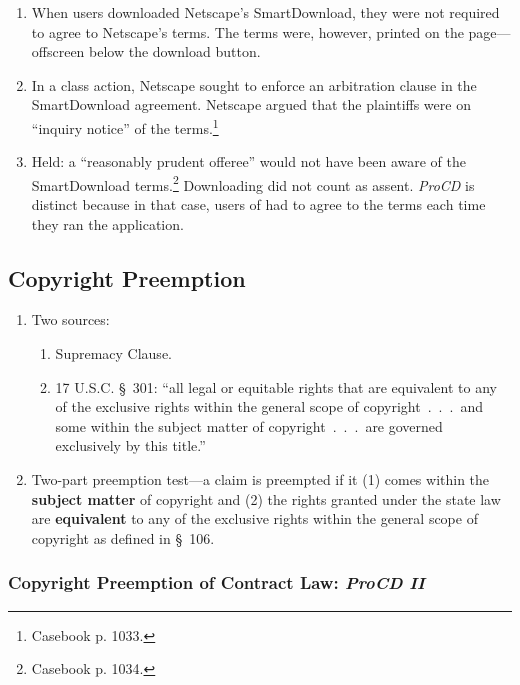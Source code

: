 \begin{enumerate}
    \item When users downloaded Netscape's SmartDownload, they were not 
    required to agree to Netscape's terms. The terms were, however, printed on 
    the page---offscreen below the download button.
    \item In a class action, Netscape sought to enforce an arbitration clause 
    in the SmartDownload agreement. Netscape argued that the plaintiffs were 
    on ``inquiry notice'' of the terms.\footnote{Casebook p. 1033.}
    \item Held: a ``reasonably prudent offeree'' would not have been aware of 
    the SmartDownload terms.\footnote{Casebook p. 1034.} Downloading did not 
    count as assent. \emph{ProCD} is distinct because in that case, users of 
    had to agree to the terms each time they ran the application.
\end{enumerate}

\subsection{Copyright Preemption}

\begin{enumerate}
    \item Two sources:
    \begin{enumerate}
        \item Supremacy Clause.
        \item 17 U.S.C. \S\ 301: ``all legal or equitable rights that are 
        equivalent to any of the exclusive rights within the general scope of 
        copyright~.~.~.~and some within the subject matter of 
        copyright~.~.~.~are governed exclusively by this title.''
    \end{enumerate}
    \item Two-part preemption test---a claim is preempted if it (1) comes 
    within the \textbf{subject matter} of copyright and (2) the rights granted 
    under the state law are \textbf{equivalent} to any of the exclusive rights 
    within the general scope of copyright as defined in \S\ 106.
\end{enumerate}

\subsubsection{Copyright Preemption of Contract Law: \emph{ProCD II}}

